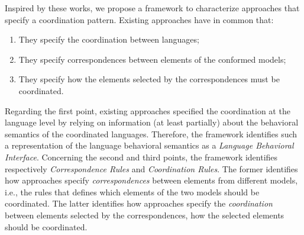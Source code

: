 Inspired by these works, we propose a framework to characterize approaches that specify a coordination pattern. Existing approaches have in common that:
\begin{enumerate}
	\item They specify the coordination between languages;
	
	\item They specify correspondences between elements of the conformed models;
	
	\item They specify how the elements selected by the correspondences must be coordinated.
\end{enumerate}	
Regarding the first point, existing approaches specified the coordination at the language level by relying on information (at least partially) about the behavioral semantics of the coordinated languages. Therefore, the framework identifies such a representation of the language behavioral semantics as a \emph{Language Behavioral Interface}. Concerning the second and third points, the framework identifies respectively \emph{Correspondence Rules} and \emph{Coordination Rules}. The former identifies how approaches specify \emph{correspondences} between elements from different models, i.e., the rules that defines which elements of the two models should be coordinated.
The latter identifies how approaches specify the \emph{coordination} between elements selected by the correspondences, \ie how the selected elements should be coordinated.


